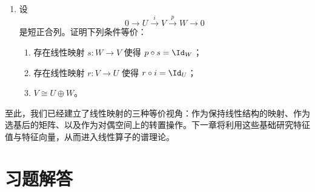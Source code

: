 \begin{enumerate}[label=\textbf{\arabic*.}, leftmargin=3.5em, start=56]
\[  \]
  是满射，且诱导同构
  \[
    V^*/U^0\cong U^*.
  \]
  \item {\hard} 设
  \[
    0\longrightarrow U\overset{i}{\longrightarrow} V\overset{p}{\longrightarrow} W\longrightarrow 0
  \]
  是短正合列。证明下列条件等价：
  \begin{enumerate}[label=\textnormal{(\alph*)}]
    \item 存在线性映射 $s\colon W\to V$ 使得 $p\circ s=\Id_W$；
    \item 存在线性映射 $r\colon V\to U$ 使得 $r\circ i=\Id_U$；
    \item $V\cong U\oplus W$。
  \end{enumerate}
\end{enumerate}

至此，我们已经建立了线性映射的三种等价视角：作为保持线性结构的映射、作为选基后的矩阵、以及作为对偶空间上的转置操作。下一章将利用这些基础研究特征值与特征向量，从而进入线性算子的谱理论。

\section*{习题解答}

